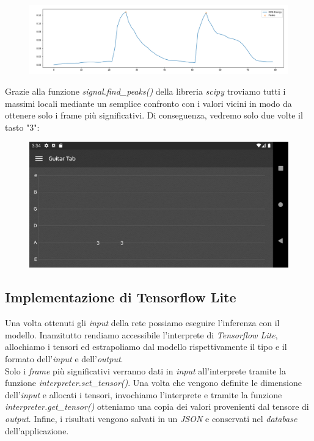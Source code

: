 \begin{figure}[H]
	\centering
	\includegraphics[scale=0.35]{./images/img27.png}
\end{figure}
\noindent Grazie alla funzione \textit{signal.find\_peaks()} della libreria \textit{scipy} troviamo tutti i massimi locali mediante un semplice confronto con i valori vicini in modo da ottenere solo i frame più significativi.
\vspace*{2ex}
\vspace*{2ex}
Di conseguenza, vedremo solo due volte il tasto "3":
\begin{figure}[H]
	\centering
	\includegraphics[scale=0.28]{./images/img24.png}
\end{figure}
\subsection{Implementazione di Tensorflow Lite}
Una volta ottenuti gli \textit{input} della rete possiamo eseguire l'inferenza con il modello. Inanzitutto rendiamo accessibile l'interprete di \textit{Tensorflow Lite}, allochiamo i tensori ed estrapoliamo dal modello rispettivamente il tipo e il formato dell'\textit{input} e dell'\textit{output}.\\ Solo i \textit{frame} più significativi verranno dati in \textit{input} all'interprete tramite la funzione \textit{interpreter.set\_tensor()}. Una volta che vengono definite le dimensione dell'\textit{input} e allocati i tensori, invochiamo l'interprete e tramite la funzione \textit{interpreter.get\_tensor()} otteniamo una copia dei valori provenienti dal tensore di \textit{output}. Infine, i risultati vengono salvati in un \textit{JSON} e conservati nel \textit{database} dell'applicazione.
\vspace*{2ex}
